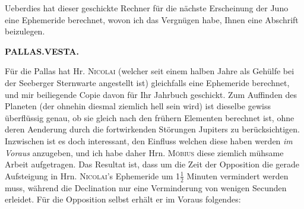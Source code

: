 \par\indent Ueberdies hat dieser geschickte Rechner für die nächste Erscheinung der Juno eine Ephemeride berechnet, wovon ich das Vergnügen habe, Ihnen eine Abschrift beizulegen.

\clearpage
\endgroup
\begingroup
\pagestyle{empty}
\newcommand{\GaussVICitation}[2]{%
  \begin{center}
  \parbox{#1\linewidth}{%
    \centering\footnotesize\frenchspacing
    \hrule height .3pt\relax\vspace{2.5pt}
    #2\par
    \vspace{2.5pt}\hrule height .3pt\relax
  }%
  \end{center}
  \par\nobreak\medskip
}
\newcommand{\GaussVIGathering}[2]{%
  \fancypagestyle{gaussVIGathering}{%
    \fancyhf{}%
    \renewcommand{\headrulewidth}{0pt}%
    \renewcommand{\footrulewidth}{0pt}%
    \fancyfoot[C]{\makebox[\textwidth][l]{%
      \hspace*{.025\textwidth}{\footnotesize\bfseries #1}\hfill
      {\normalsize\bfseries\textls[90]{#2}}\hspace*{.18\textwidth}}}%
  }%
  \thispagestyle{gaussVIGathering}%
}
\thispagestyle{empty}
\noindent{}%
\makebox[12mm][l]{}%
\parbox[t]{\dimexpr\linewidth-24mm\relax}{\centering\footnotesize\bfseries PALLAS.\quad VESTA.\par}%
\par\nobreak\medskip
\par\indent Für die Pallas hat Hr. \textsc{Nicolai} (welcher seit einem halben Jahre als Gehülfe bei der
Seeberger Sternwarte angestellt ist) gleichfalls eine Ephemeride berechnet, und mir beiliegende
Copie davon für Ihr Jahrbuch geschickt. Zum Auffinden des Planeten (der ohnehin diesmal ziemlich
hell sein wird) ist dieselbe gewiss überflüssig genau, ob sie gleich nach den frühern Elementen
berechnet ist, ohne deren Aenderung durch die fortwirkenden Störungen Jupiters zu berücksichtigen.
Inzwischen ist es doch interessant, den Einfluss welchen diese haben werden \emph{im Voraus}
anzugeben, und ich habe daher Hrn. \textsc{Möbius} diese ziemlich mühsame Arbeit aufgetragen. Das
Resultat ist, dass um die Zeit der Opposition die gerade Aufsteigung in Hrn. \textsc{Nicolai}'s
Ephemeride um 1$\frac{1}{2}$ Minuten vermindert werden muss, während die Declination nur eine
Verminderung von wenigen Secunden erleidet. Für die Opposition selbst erhält er im Voraus
folgendes:

